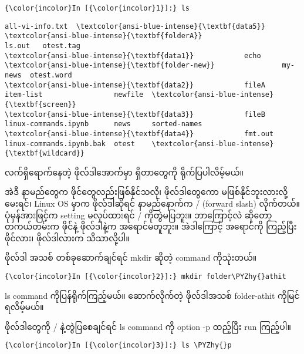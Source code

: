 \documentclass[11pt]{article}
\def\PYZhy{\char`\-}
\begin{document}
    \begin{Verbatim}[commandchars=\\\{\}]
{\color{incolor}In [{\color{incolor}1}]:} ls
\end{Verbatim}

    \begin{Verbatim}[commandchars=\\\{\}]
all-vi-info.txt  \textcolor{ansi-blue-intense}{\textbf{data5}}    \textcolor{ansi-blue-intense}{\textbf{folderA}}                   ls.out   otest.tag
\textcolor{ansi-blue-intense}{\textbf{data1}}            echo     \textcolor{ansi-blue-intense}{\textbf{folder-new}}                my-news  otest.word
\textcolor{ansi-blue-intense}{\textbf{data2}}            fileA    item-list                 newfile  \textcolor{ansi-blue-intense}{\textbf{screen}}
\textcolor{ansi-blue-intense}{\textbf{data3}}            fileB    linux-commands.ipynb      news     sorted-names
\textcolor{ansi-blue-intense}{\textbf{data4}}            fmt.out  linux-commands.ipynb.bak  otest    \textcolor{ansi-blue-intense}{\textbf{wildcard}}

    \end{Verbatim}

    လက်ရှိရောက်နေတဲ့ ဖိုလ်ဒါအောက်မှာ ရှိတာတွေကို ရိုက်ပြပါလိမ့်မယ်။

    အဲဒီ နာမည်တွေက ဖိုင်တွေလည်းဖြစ်နိုင်သလို၊ ဖိုလ်ဒါတွေကော
မဖြစ်နိုင်ဘူးလားလို့ မေးရင်၊ Linux OS မှာက ဖိုလ်ဒါဆိုရင် နာမည်နောက်က /
(forward slash) လိုက်တယ်။ ပုံမှန်အားဖြင့်က setting မလုပ်ထားရင် /
ကိုတွဲမပြဘူး။ ဘာကြောင့်လဲ ဆိုတော့ တကယ်တမ်းက ဖိုင်နဲ့ ဖိုလ်ဒါနဲ့က
အရောင်မတူဘူး။ အဲဒါကြောင့် အရောင်ကို ကြည့်ပြီး ဖိုင်လား၊ ဖိုလ်ဒါလားက
သိသာလို့ပါ။

ဖိုလ်ဒါ အသစ် တစ်ခုဆောက်ချင်ရင် mkdir ဆိုတဲ့ command ကိုသုံးတယ်။

    \begin{Verbatim}[commandchars=\\\{\}]
{\color{incolor}In [{\color{incolor}2}]:} mkdir folder\PYZhy{}athit
\end{Verbatim}

    ls command ကိုပြန်ရိုက်ကြည့်မယ်။ ဆောက်လိုက်တဲ့ ဖိုလ်ဒါအသစ် folder-athit
ကိုမြင်ရလိမ့်မယ်။

ဖိုလ်ဒါတွေကို / နဲ့တွဲပြစေချင်ရင် ls command ကို option -p ထည့်ပြီး run
ကြည့်ပါ။

    \begin{Verbatim}[commandchars=\\\{\}]
{\color{incolor}In [{\color{incolor}3}]:} ls \PYZhy{}p
\end{Verbatim}
\end{document}
